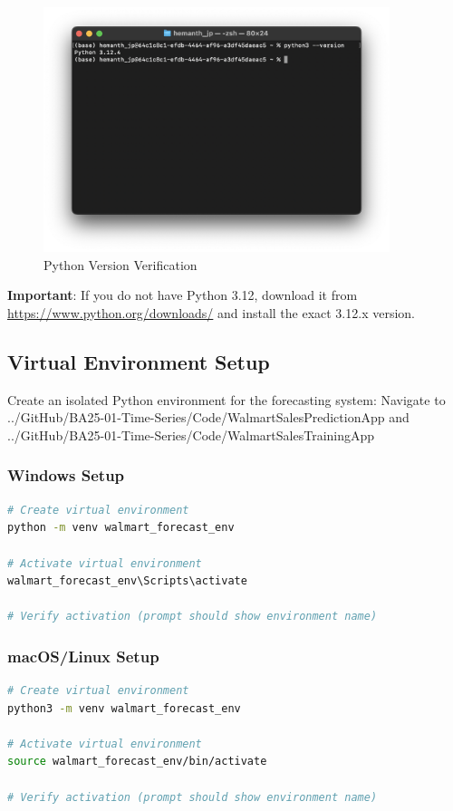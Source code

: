 \begin{figure}[H]
    \centering
    \includegraphics[width=0.9\textwidth]{Images/02InstallationAndSetup/PythonVersion.png}
    \caption{Python Version Verification}
    \label{fig:python_version}
\end{figure}

\textbf{Important}: If you do not have Python 3.12, download it from \url{https://www.python.org/downloads/} and install the exact 3.12.x version.

\subsection{Virtual Environment Setup}

Create an isolated Python environment for the forecasting system:
Navigate to 
../GitHub/BA25-01-Time-Series/Code/WalmartSalesPredictionApp
and 
../GitHub/BA25-01-Time-Series/Code/WalmartSalesTrainingApp

\subsubsection{Windows Setup}
\begin{lstlisting}[language=bash]
# Create virtual environment
python -m venv walmart_forecast_env

# Activate virtual environment
walmart_forecast_env\Scripts\activate

# Verify activation (prompt should show environment name)
\end{lstlisting}

\subsubsection{macOS/Linux Setup}
\begin{lstlisting}[language=bash]
# Create virtual environment
python3 -m venv walmart_forecast_env

# Activate virtual environment
source walmart_forecast_env/bin/activate

# Verify activation (prompt should show environment name)
\end{lstlisting}


